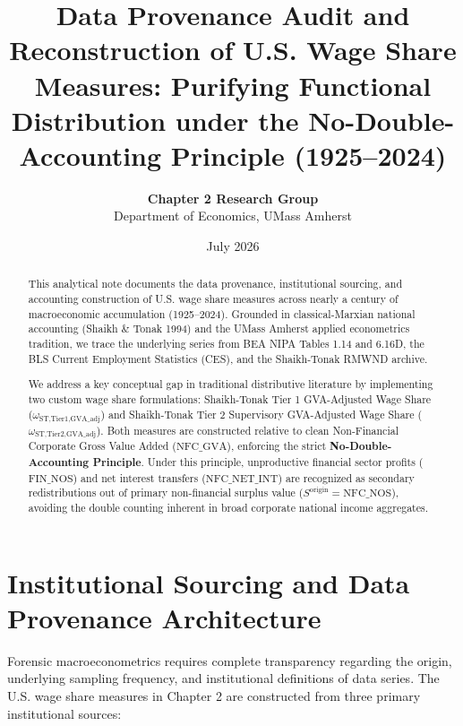 \documentclass[11pt,a4paper]{article}
\title{\textbf{Data Provenance Audit and Reconstruction of U.S. Wage Share Measures: Purifying Functional Distribution under the No-Double-Accounting Principle (1925--2024)}}
\author{\textbf{Chapter 2 Research Group} \\ Department of Economics, UMass Amherst}
\date{July 2026}
\begin{document}
\maketitle

\begin{abstract}
This analytical note documents the data provenance, institutional sourcing, and accounting construction of U.S. wage share measures across nearly a century of macroeconomic accumulation (1925--2024). Grounded in classical-Marxian national accounting (Shaikh \& Tonak 1994) and the UMass Amherst applied econometrics tradition, we trace the underlying series from BEA NIPA Tables 1.14 and 6.16D, the BLS Current Employment Statistics (CES), and the Shaikh-Tonak RMWND archive. 

We address a key conceptual gap in traditional distributive literature by implementing two custom wage share formulations: Shaikh-Tonak Tier 1 GVA-Adjusted Wage Share ($\omega_{\text{ST,Tier1,GVA\_adj}}$) and Shaikh-Tonak Tier 2 Supervisory GVA-Adjusted Wage Share ($\omega_{\text{ST,Tier2,GVA\_adj}}$). Both measures are constructed relative to clean Non-Financial Corporate Gross Value Added ($\text{NFC\_GVA}$), enforcing the strict \textbf{No-Double-Accounting Principle}. Under this principle, unproductive financial sector profits ($\text{FIN\_NOS}$) and net interest transfers ($\text{NFC\_NET\_INT}$) are recognized as secondary redistributions out of primary non-financial surplus value ($S^{\text{origin}} = \text{NFC\_NOS}$), avoiding the double counting inherent in broad corporate national income aggregates.
\end{abstract}

\FloatBarrier
\section{Institutional Sourcing and Data Provenance Architecture}

Forensic macroeconometrics requires complete transparency regarding the origin, underlying sampling frequency, and institutional definitions of data series. The U.S. wage share measures in Chapter 2 are constructed from three primary institutional sources:
\end{document}
